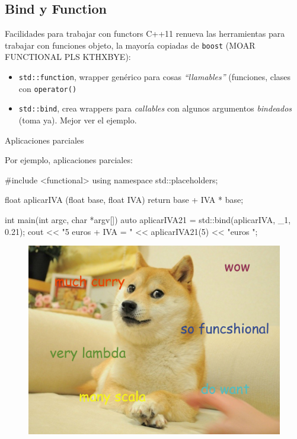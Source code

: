 \documentclass[8pt,xcolor=svgnames]{beamer}
\begin{document}
\subsection{Bind y Function}

\begin{frame}{Facilidades para trabajar con functors}
  C++11 renueva las herramientas para trabajar con funciones objeto, la mayoría
  copiadas de \texttt{boost} (MOAR FUNCTIONAL PLS KTHXBYE):

  \begin{itemize}
  \item \texttt{std::function}, wrapper genérico para cosas
    \textit{``llamables''} (funciones, clases con \texttt{operator()}
  \item \texttt{std::bind}, crea wrappers para \textit{callables} con algunos
    argumentos \textit{bindeados} (toma ya). Mejor ver el ejemplo.
  \end{itemize}

\end{frame}

\begin{frame}[fragile]{Aplicaciones parciales}

Por ejemplo, aplicaciones parciales:

\begin{cppcode}
#include <functional>
using namespace std::placeholders;

float aplicarIVA (float base, float IVA) {
    return base + IVA * base;
}

int main(int argc, char *argv[])
{
    auto aplicarIVA21 = std::bind(aplicarIVA, _1, 0.21);
    cout << "5 euros + IVA = " << aplicarIVA21(5) << "euros \n";
}  
\end{cppcode}
  
\end{frame}

\begin{frame}
  \begin{figure}[c!]
    \centering
    \includegraphics[width=\textwidth]{img_doge_functional.jpg}
  \end{figure}
\end{frame}
\end{document}
